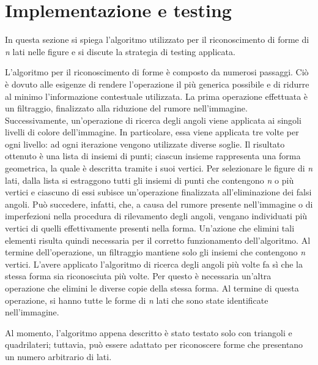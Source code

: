 	\section*{Implementazione e testing}
		In questa sezione si spiega l'algoritmo utilizzato per il riconoscimento di forme di \emph{n} lati nelle figure e si discute la strategia di testing applicata.
		
		L'algoritmo per il riconoscimento di forme è composto da numerosi passaggi.
		Ciò è dovuto alle esigenze di rendere l'operazione il più generica possibile e di ridurre al minimo l'informazione contestuale utilizzata.
		La prima operazione effettuata è un filtraggio, finalizzato alla riduzione del rumore nell'immagine.
		Successivamente, un'operazione di ricerca degli angoli viene applicata ai singoli livelli di colore dell'immagine.
		In particolare, essa viene applicata tre volte per ogni livello: ad ogni iterazione vengono utilizzate diverse soglie.
		Il risultato ottenuto è una lista di insiemi di punti; ciascun insieme rappresenta una forma geometrica, la quale è descritta tramite i suoi vertici.
		Per selezionare le figure di \emph{n} lati, dalla lista si estraggono tutti gli insiemi di punti che contengono \emph{n} o più vertici e ciascuno di essi subisce un'operazione finalizzata all'eliminazione dei falsi angoli.
		Può succedere, infatti, che, a causa del rumore presente nell'immagine o di imperfezioni nella procedura di rilevamento degli angoli, vengano individuati più vertici di quelli effettivamente presenti nella forma.
		Un'azione che elimini tali elementi risulta quindi necessaria per il corretto funzionamento dell'algoritmo.
		Al termine dell'operazione, un filtraggio mantiene solo gli insiemi che contengono \emph{n} vertici.
		L'avere applicato l'algoritmo di ricerca degli angoli più volte fa sì che la stessa forma sia riconosciuta più volte.	
		Per questo è necessaria un'altra operazione che elimini le diverse copie della stessa forma.
		Al termine di questa operazione, si hanno tutte le forme di \emph{n} lati che sono state identificate nell'immagine. 

		Al momento, l'algoritmo appena descritto è stato testato solo con triangoli e quadrilateri; tuttavia, può essere adattato per riconoscere forme che presentano un numero arbitrario di lati. 
		
